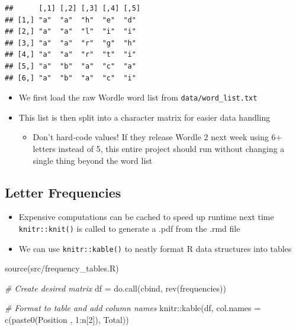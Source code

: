 \documentclass[
]{article}
\newenvironment{Shaded}{\begin{snugshade}}{\end{snugshade}}
\newcommand{\AttributeTok}[1]{\textcolor[rgb]{0.77,0.63,0.00}{#1}}
\newcommand{\CommentTok}[1]{\textcolor[rgb]{0.56,0.35,0.01}{\textit{#1}}}
\newcommand{\DecValTok}[1]{\textcolor[rgb]{0.00,0.00,0.81}{#1}}
\newcommand{\FunctionTok}[1]{\textcolor[rgb]{0.00,0.00,0.00}{#1}}
\newcommand{\NormalTok}[1]{#1}
\newcommand{\OtherTok}[1]{\textcolor[rgb]{0.56,0.35,0.01}{#1}}
\newcommand{\SpecialCharTok}[1]{\textcolor[rgb]{0.00,0.00,0.00}{#1}}
\newcommand{\StringTok}[1]{\textcolor[rgb]{0.31,0.60,0.02}{#1}}
\providecommand{\tightlist}{%
  \setlength{\itemsep}{0pt}\setlength{\parskip}{0pt}}
\begin{document}
\begin{verbatim}
##      [,1] [,2] [,3] [,4] [,5]
## [1,] "a"  "a"  "h"  "e"  "d" 
## [2,] "a"  "a"  "l"  "i"  "i" 
## [3,] "a"  "a"  "r"  "g"  "h" 
## [4,] "a"  "a"  "r"  "t"  "i" 
## [5,] "a"  "b"  "a"  "c"  "a" 
## [6,] "a"  "b"  "a"  "c"  "i"
\end{verbatim}

\begin{itemize}
\item
  We first load the raw Wordle word list from
  \texttt{data/word\_list.txt}
\item
  This list is then split into a character matrix for easier data
  handling

  \begin{itemize}
  \tightlist
  \item
    Don't hard-code values! If they release Wordle 2 next week using 6+
    letters instead of 5, this entire project should run without
    changing a single thing beyond the word list
  \end{itemize}
\end{itemize}

\hypertarget{letter-frequencies}{%
\subsection{Letter Frequencies}\label{letter-frequencies}}

\begin{itemize}
\item
  Expensive computations can be cached to speed up runtime next time
  \texttt{knitr::knit()} is called to generate a .pdf from the .rmd file
\item
  We can use \texttt{knitr::kable()} to neatly format R data structures
  into tables
\end{itemize}

\begin{Shaded}
\begin{Highlighting}[]
\FunctionTok{source}\NormalTok{(}\StringTok{\textquotesingle{}src/frequency\_tables.R\textquotesingle{}}\NormalTok{)}

\CommentTok{\# Create desired matrix}
\NormalTok{df }\OtherTok{=} \FunctionTok{do.call}\NormalTok{(cbind, }\FunctionTok{rev}\NormalTok{(frequencies))}

\CommentTok{\# Format to table and add column names}
\NormalTok{knitr}\SpecialCharTok{::}\FunctionTok{kable}\NormalTok{(df, }\AttributeTok{col.names =} \FunctionTok{c}\NormalTok{(}\FunctionTok{paste0}\NormalTok{(}\StringTok{\textquotesingle{}Position \textquotesingle{}}\NormalTok{, }\DecValTok{1}\SpecialCharTok{:}\NormalTok{n[}\DecValTok{2}\NormalTok{]), }\StringTok{\textquotesingle{}Total\textquotesingle{}}\NormalTok{))}
\end{Highlighting}
\end{Shaded}
\end{document}
